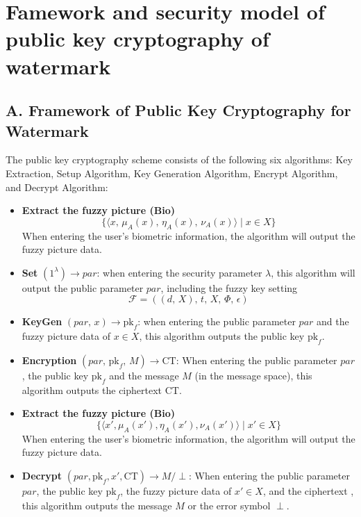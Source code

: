 \documentclass[graybox]{svmult}
\begin{document}
\section{Famework and security model of public key cryptography of watermark}
\subsection*{A. Framework of Public Key Cryptography for Watermark}

The public key cryptography scheme consists of the following six algorithms: Key Extraction, Setup Algorithm, Key Generation Algorithm, Encrypt Algorithm, and Decrypt Algorithm:

\begin{itemize}
    \item \textbf{Extract the fuzzy picture (Bio)}
          \[
              \{ \langle x,\, \mu_A(x),\, \eta_A(x),\, \nu_A(x) \rangle \mid x \in X \}
          \]
          When entering the user's biometric information, the algorithm will output the fuzzy picture data.

    \item \textbf{Set} \( (1^\lambda) \to par  \): when entering the security parameter \( \lambda \), this algorithm will output the public parameter \(  par \), including the fuzzy key setting
          \[
              \mathcal{F} = ((d, \, X), \, t, \, X, \, \varPhi, \, \epsilon)
          \]

    \item \textbf{KeyGen} \( (par ,\, x) \to \text{pk}_f \): when entering the public parameter \(  par \) and the fuzzy picture data of \( x \in X \), this algorithm outputs the public key \( \text{pk}_f \).

    \item \textbf{Encryption} \( (par ,\, \text{pk}_f,\, M) \to \text{CT} \): When entering the public parameter \(  par \), the public key \( \text{pk}_f \) and the message \( M \) (in the message space), this algorithm outputs the ciphertext \( \text{CT} \).

    \item \textbf{Extract the fuzzy picture (Bio)}
          \[
              \{ \langle x', \mu_A(x'), \eta_A(x'), \nu_A(x') \rangle \mid x' \in X \}
          \]
          When entering the user's biometric information, the algorithm will output the fuzzy picture data.

    \item \textbf{Decrypt} \( (par , \text{pk}_f, x', \text{CT}) \to M/\perp \): When entering the public parameter \(  par \), the public key \( \text{pk}_f \), the fuzzy picture data of \( x' \in X \), and the ciphertext , this algorithm outputs the message \( M \) or the error symbol \( \perp \).

\end{itemize}
\end{document}
